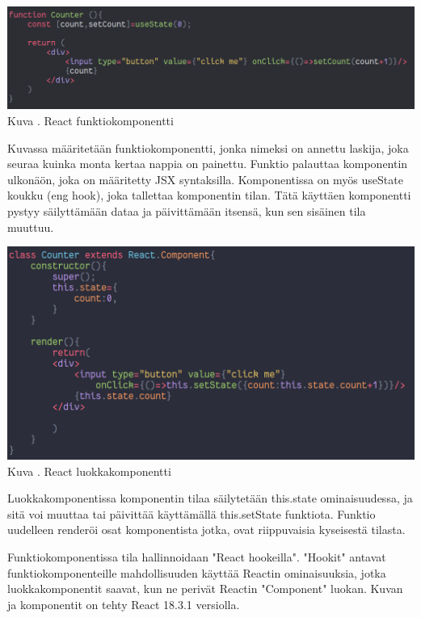 \bigskip
\includegraphics[width=15cm]{src/public/oppar/function_component.png}\\
Kuva \getImgCount{}. React funktiokomponentti
\medskip

Kuvassa \theimgCounter{} määritetään funktiokomponentti, jonka nimeksi on annettu laskija, joka seuraa kuinka monta kertaa nappia on painettu.
Funktio palauttaa komponentin ulkonäön, joka on määritetty JSX syntaksilla.
Komponentissa on myös useState koukku (eng hook), joka tallettaa komponentin tilan.
Tätä käyttäen komponentti pystyy säilyttämään dataa ja päivittämään itsensä, kun sen sisäinen tila muuttuu.
\medskip




\bigskip
\includegraphics[width=15cm]{src/public/oppar/class_.png}\\
Kuva \getImgCount{}. React luokkakomponentti
\medskip



Luokkakomponentissa komponentin tilaa säilytetään this.state ominaisuudessa, ja sitä voi muuttaa tai päivittää käyttämällä this.setState funktiota. 
Funktio uudelleen renderöi osat komponentista jotka, ovat riippuvaisia kyseisestä tilasta.
\medskip


Funktiokomponentissa tila hallinnoidaan "React hookeilla"{}. 
"Hookit"{} antavat funktiokomponenteille mahdollisuuden käyttää Reactin ominaisuuksia, 
jotka luokkakomponentit saavat, kun ne perivät Reactin "Component"{} luokan.
Kuvan \prevImageCount{} ja \theimgCounter{} komponentit on tehty React 18.3.1 versiolla.
\medskip



